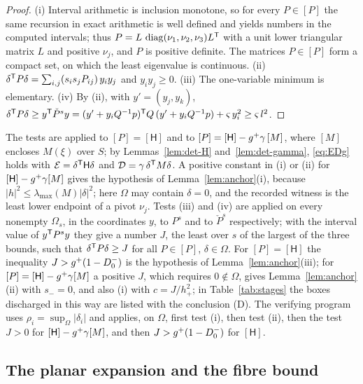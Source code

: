 \begin{proof}
(i) Interval arithmetic is inclusion monotone, so for every $P\in[P]$ the same recursion in exact arithmetic is well defined and
yields numbers in the computed intervals; thus $P=L\,\operatorname{diag}(\nu_1,\nu_2,\nu_3)L^\mathsf T$ with a unit lower triangular matrix $L$ and
positive $\nu_j$, and $P$ is positive definite. The matrices $P\in[P]$ form a compact set, on which the least eigenvalue is
continuous. (ii) $\delta^\mathsf T P\delta=\sum_{i,j}(s_is_jP_{ij})\,y_iy_j$ and $y_iy_j\ge0$. (iii) The one-variable minimum is elementary.
(iv) By (ii), with $y'=(y_j,y_k)$,
$\delta^\mathsf T P\delta\ge y^\mathsf T\check P^sy=(y'+y_iQ^{-1}p)^\mathsf T Q\,(y'+y_iQ^{-1}p)+\varsigma\,y_i^2\ge\varsigma\,l^2$.
\end{proof}

The tests are applied to $[P]=[\mathsf H]$ and to $[P]=[\mathsf H]-g^+\gamma\,[M]$, where $[M]$ encloses $M(\xi)$ over $S$; by
Lemmas~\ref{lem:det-H} and~\ref{lem:det-gamma}, \eqref{eq:EDg} holds with $\mathcal E=\delta^\mathsf T\mathsf H\delta$ and
$\mathcal D=\gamma\,\delta^\mathsf T M\delta$. A positive constant in (i) or (ii) for $[\mathsf H]-g^+\gamma[M]$ gives the hypothesis of
Lemma~\ref{lem:anchor}(i), because $|h|^2\le\lambda_{\max}(M)|\delta|^2$; here $\Omega$ may contain $\delta=0$, and the recorded
witness is the least lower endpoint of a pivot $\nu_j$. Tests (iii) and (iv) are applied on every nonempty $\Omega_s$, in the
coordinates $y$, to $P^s$ and to $\check P^s$ respectively; with the interval value of $y^\mathsf T P^sy$ they give a number $J$, the
least over $s$ of the largest of the three bounds, such that $\delta^\mathsf T P\delta\ge J$ for all $P\in[P]$, $\delta\in\Omega$. For
$[P]=[\mathsf H]$ the inequality $J>g^+(1-D_0^-)$ is the hypothesis of Lemma~\ref{lem:anchor}(iii); for
$[P]=[\mathsf H]-g^+\gamma[M]$ a positive $J$, which requires $0\notin\Omega$, gives Lemma~\ref{lem:anchor}(ii) with $s_-=0$, and
also (i) with $c=J/h_+^2$; in Table~\ref{tab:stages} the boxes discharged in this way are listed with the conclusion (D). The
verifying program uses $\rho_i=\sup_\Omega|\delta_i|$ and applies, on $\Omega$, first test (i), then test (ii), then the test
$J>0$ for $[\mathsf H]-g^+\gamma[M]$, and then $J>g^+(1-D_0^-)$ for $[\mathsf H]$.

\subsection{The planar expansion and the fibre bound}\label{ssec:det-fibre}

